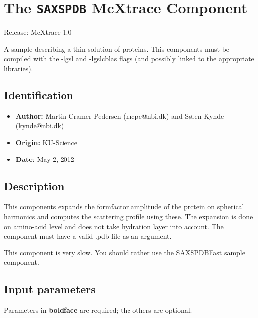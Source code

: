 \section{The \texttt{SAXSPDB} McXtrace Component}
Release: McXtrace 1.0

A sample describing a thin solution of proteins. This components must be compiled
with the -lgsl and -lgslcblas flags (and possibly linked to the appropriate
libraries).

\subsection*{Identification}
\begin{itemize}
  \item \textbf{Author:} Martin Cramer Pedersen (mcpe@nbi.dk) and Søren Kynde (kynde@nbi.dk)
  \item \textbf{Origin:} KU-Science
  \item \textbf{Date:} May 2, 2012
\end{itemize}

\subsection*{Description}
This components expands the formfactor amplitude of the protein on spherical harmonics and computes the scattering profile using these. The expansion is done on amino-acid level and does not take hydration layer into account. The component must have a valid .pdb-file as an argument.

This component is very slow. You should rather use the SAXSPDBFast sample component.

\subsection*{Input parameters}
Parameters in \textbf{boldface} are required; the others are optional.

